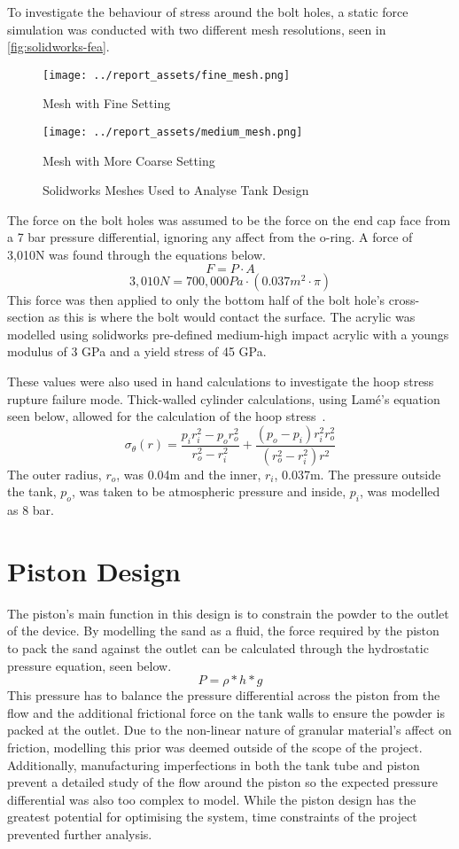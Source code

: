 To investigate the behaviour of stress around the bolt holes, a static force simulation was conducted with two different mesh resolutions, seen in \autoref{fig:solidworks-fea}. 
\begin{figure}[htbp]
    \centering

    \begin{minipage}{0.45\textwidth}
        \centering
        \texttt{[image: ../report\_assets/fine\_mesh.png]}
        \caption*{Mesh with Fine Setting}
    \end{minipage}
    \hfill
    \begin{minipage}{0.45\textwidth}
        \centering
        \texttt{[image: ../report\_assets/medium\_mesh.png]}
        \caption*{Mesh with More Coarse Setting}
    \end{minipage}
    \caption{Solidworks Meshes Used to Analyse Tank Design}\label{fig:solidworks-fea}
\end{figure}
The force on the bolt holes was assumed to be the force on the end cap face from a 7 bar pressure differential, ignoring any affect from the o-ring. A force of 3,010N was found through the equations below.
\[
F = P \cdot A
\]
\[
3,010N = 700,000Pa \cdot (0.037m^2 \cdot \pi)
\]
This force was then applied to only the bottom half of the bolt hole's cross-section as this is where the bolt would contact the surface. The acrylic was modelled using solidworks pre-defined medium-high impact acrylic with a youngs modulus of 3 GPa and a yield stress of 45 GPa. 

These values were also used in hand calculations to investigate the hoop stress rupture failure mode. Thick-walled cylinder calculations, using Lamé's equation seen below, allowed for the calculation of the hoop stress~\cite{mydatabook_lame}.
\[
\sigma_\theta(r) = \frac{p_i r_i^2 - p_o r_o^2}{r_o^2 - r_i^2} + \frac{(p_o - p_i) r_i^2 r_o^2}{(r_o^2 - r_i^2) r^2}
\]
The outer radius, $r_o$, was 0.04m and the inner, $r_i$, 0.037m. The pressure outside the tank, $p_o$, was taken to be atmospheric pressure and inside, $p_i$, was modelled as 8 bar.
\section{Piston Design}\label{sec:piston}
The piston's main function in this design is to constrain the powder to the outlet of the device. By modelling the sand as a fluid, the force required by the piston to pack the sand against the outlet can be calculated through the hydrostatic pressure equation, seen below. 
\[
P = \rho * h * g
\]
This pressure has to balance the pressure differential across the piston from the flow and the additional frictional force on the tank walls to ensure the powder is packed at the outlet. Due to the non-linear nature of granular material's affect on friction, modelling this prior was deemed outside of the scope of the project. Additionally, manufacturing imperfections in both the tank tube and piston prevent a detailed study of the flow around the piston so the expected pressure differential was also too complex to model. While the piston design has the greatest potential for optimising the system, time constraints of the project prevented further analysis.

